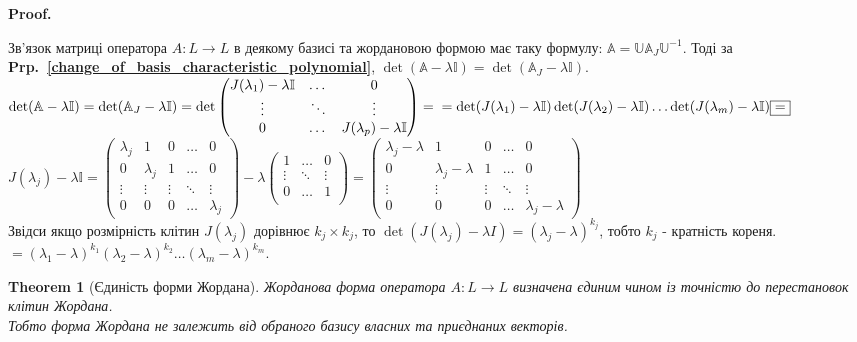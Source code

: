 \documentclass[a4paper, 10pt]{article}
\makeatletter
\theoremstyle{theoremdd}
\newtheorem{theorem}{Theorem}[subsection]
\newcommand\prpref[1]{\textbf{Prp.~\ref{#1}}}
\renewenvironment{proof}[1][Proof.\\]{\par
\pushQED{\hfill \qed}%
\normalfont \topsep6\p@\@plus6\p@\relax
\trivlist
\item\relax
{\bfseries
#1\@addpunct{.}}\hspace\labelsep\ignorespaces
}{%
\popQED\endtrivlist\@endpefalse
}
\makeatother
\begin{document}
\begin{proof}
Зв'язок матриці оператора $A: L \to L$ в деякому базисі та жордановою формою має таку формулу: $\mathbb{A} = \mathbb{U} \mathbb{A}_J \mathbb{U}^{-1}$. Тоді за \prpref{change_of_basis_characteristic_polynomial}, $\det (\mathbb{A}-\lambda \mathbb{I}) = \det (\mathbb{A}_J -\lambda \mathbb{I})$.\\
$\det (\mathbb{A} - \lambda \mathbb{I}) = \det (\mathbb{A}_{J} - \lambda \mathbb{I}) = \det \begin{pmatrix}
J(\lambda_1) - \lambda \mathbb{I} & \dots & 0 \\
\vdots & \ddots & \vdots \\
0 & \dots & J(\lambda_p) - \lambda \mathbb{I}
\end{pmatrix} = \\ = \det(J(\lambda_1)-\lambda \mathbb{I}) \det(J(\lambda_2)-\lambda \mathbb{I}) \dots \det(J(\lambda_m)-\lambda \mathbb{I}) \boxed{=} \\
$
$J(\lambda_j)-\lambda \mathbb{I} = \begin{pmatrix}
\lambda_j & 1 & 0 & \dots & 0 \\
0 & \lambda_j & 1 & \dots & 0 \\
\vdots & \vdots & \vdots & \ddots & \vdots \\
0 & 0 & 0 & \dots & \lambda_j
\end{pmatrix} - \lambda \begin{pmatrix}
1 & \dots & 0 \\
\vdots & \ddots & \vdots \\
0 & \dots & 1 \\
\end{pmatrix} = \begin{pmatrix}
\lambda_j - \lambda & 1 & 0 & \dots & 0 \\
0 & \lambda_j - \lambda & 1 & \dots & 0 \\
\vdots & \vdots & \vdots & \ddots & \vdots \\
0 & 0 & 0 & \dots & \lambda_j - \lambda
\end{pmatrix}$\\
Звідси якщо розмірність клітин $J(\lambda_j)$ дорівнює $k_j \times k_j$, то $\det (J(\lambda_j) - \lambda I) = (\lambda_j - \lambda)^{k_j}$, тобто $k_j$ - кратність кореня.\\
$\boxed{=} (\lambda_1-\lambda)^{k_1}(\lambda_2-\lambda)^{k_2} \dots (\lambda_m-\lambda)^{k_m}$.
\end{proof}

\begin{theorem}[Єдиність форми Жордана]
Жорданова форма оператора $A: L \to L$ визначена єдиним чином із точністю до перестановок клітин Жордана.\\
Тобто форма Жордана не залежить від обраного базису власних та приєднаних векторів.
\end{theorem}
\end{document}
